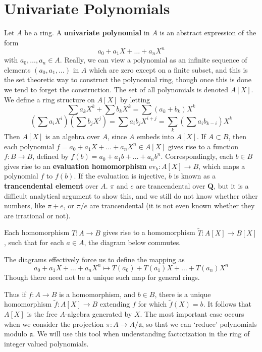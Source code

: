 \section{Univariate Polynomials}

Let $A$ be a ring. A {\bf univariate polynomial} in $A$ is an abstract expression of the form
%
\[ a_0 + a_1 X + \dots + a_n X^n \]
%
with $a_0,\dots,a_n \in A$. Really, we can view a polynomial as an infinite sequence of elements $(a_0, a_1, \dots)$ in $A$ which are zero except on a finite subset, and this is the set theoretic way to construct the polynomial ring, though once this is done we tend to forget the construction. The set of all polynomials is denoted $A[X]$. We define a ring structure on $A[X]$ by letting
%
\[ \sum a_k X^k + \sum b_k X^k = \sum (a_k + b_k) X^k \]
%
\[ \left( \sum a_i X^i \right) \left( \sum b_j X^j \right) = \sum a_i b_j X^{i + j} = \sum_k \left( \sum a_i b_{k - i} \right) X^k \]
%
Then $A[X]$ is an algebra over $A$, since $A$ embeds into $A[X]$. If $A \subset B$, then each polynomial $f = a_0 + a_1 X + \dots + a_n X^n \in A[X]$ gives rise to a function $f: B \to B$, defined by $f(b) = a_0 + a_1 b + \dots + a_n b^n$. Correspondingly, each $b \in B$ gives rise to an {\bf evaluation homomorphism} $\text{ev}_b: A[X] \to B$, which maps a polynomial $f$ to $f(b)$. If the evaluation is injective, $b$ is known as a {\bf trancendental element} over $A$. $\pi$ and $e$ are trancendental over $\mathbf{Q}$, but it is a difficult analytical argument to show this, and we still do not know whether other numbers, like $\pi + e$, or $\pi/e$ are trancendental (it is not even known whether they are irrational or not).

Each homomorphism $T: A \to B$ gives rise to a homomorphism $\tilde{T}: A[X] \to B[X]$, such that for each $a \in A$, the diagram below commutes.
%
\begin{center}
\end{center}
%
The diagrams effectively force us to define the mapping as
%
\[ a_0 + a_1 X + \dots + a_n X^n \mapsto T(a_0) + T(a_1) X + \dots + T(a_n) X^n \]
%
Though there need not be a unique such map for general rings.

Thus if $f:A \to B$ is a homomorphism, and $b \in B$, there is a unique homomorphism $\tilde{f}: A[X] \to B$ extending $f$ for which $\tilde{f}(X) = b$. It follows that $A[X]$ is the free $A$-algebra generated by $X$. The most important case occurs when we consider the projection $\pi : A \to A/\mathfrak{a}$, so that we can `reduce' polynomials modulo $\mathfrak{a}$. We will use this tool when understanding factorization in the ring of integer valued polynomials.




